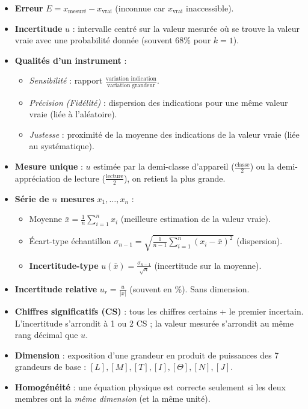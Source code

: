 \documentclass[11pt]{article}
\newcounter{popsec}
\newcounter{popsub}
\newcommand{\courssub}[1]{%
  \stepcounter{popsub}%
  \par\vspace{9pt}\noindent{\popxbold\fontsize{11.5}{13}\selectfont\color{popink}{\color{poporange}\thepopsec.\thepopsub}\hspace{6pt}#1}\par\nopagebreak\vspace{4pt}
}
\begin{document}
\begin{bilan}
\courssub{Définitions clés}
\begin{itemize}
    \item \textbf{Erreur} $E = x_{\text{mesuré}} - x_{\text{vrai}}$ (inconnue car $x_{\text{vrai}}$ inaccessible).
    \item \textbf{Incertitude} $u$ : intervalle centré sur la valeur mesurée où se trouve la valeur vraie avec une probabilité donnée (souvent 68\% pour $k=1$).
    \item \textbf{Qualités d'un instrument} :
    \begin{itemize}
        \item \textit{Sensibilité} : rapport $\frac{\text{variation indication}}{\text{variation grandeur}}$.
        \item \textit{Précision (Fidélité)} : dispersion des indications pour une même valeur vraie (liée à l'aléatoire).
        \item \textit{Justesse} : proximité de la moyenne des indications de la valeur vraie (liée au systématique).
    \end{itemize}
    \item \textbf{Mesure unique} : $u$ estimée par la demi-classe d'appareil ($\frac{\text{classe}}{2}$) ou la demi-appréciation de lecture ($\frac{\text{lecture}}{2}$), on retient la plus grande.
    \item \textbf{Série de $n$ mesures} $x_1, \dots, x_n$ :
    \begin{itemize}
        \item Moyenne $\bar{x} = \frac{1}{n}\sum_{i=1}^n x_i$ (meilleure estimation de la valeur vraie).
        \item Écart-type échantillon $\sigma_{n-1} = \sqrt{\frac{1}{n-1}\sum_{i=1}^n (x_i - \bar{x})^2}$ (dispersion).
        \item \textbf{Incertitude-type} $u(\bar{x}) = \frac{\sigma_{n-1}}{\sqrt{n}}$ (incertitude sur la moyenne).
    \end{itemize}
    \item \textbf{Incertitude relative} $u_r = \frac{u}{|x|}$ (souvent en \%). Sans dimension.
    \item \textbf{Chiffres significatifs (CS)} : tous les chiffres certains + le premier incertain. L'incertitude s'arrondit à 1 ou 2 CS ; la valeur mesurée s'arrondit au même rang décimal que $u$.
    \item \textbf{Dimension} : exposition d'une grandeur en produit de puissances des 7 grandeurs de base : $[L], [M], [T], [I], [\Theta], [N], [J]$.
    \item \textbf{Homogénéité} : une équation physique est correcte seulement si les deux membres ont la \emph{même dimension} (et la même unité).
\end{itemize}


\end{bilan}
\end{document}
